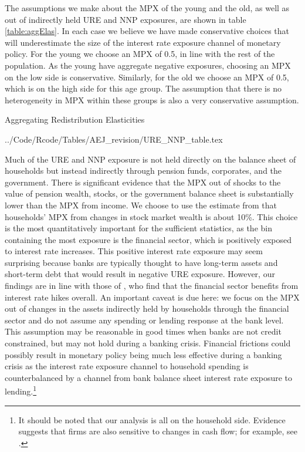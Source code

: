 \documentclass[titlepage]{\econtex}\newcommand{\texname}{ConsumptionHeterogeneity}
\newcommand{\tabdir}{../Code/Rcode/Tables/AEJ_revision}
\begin{document}
	The assumptions we make about the MPX of the young and the old, as well as out of indirectly held URE and NNP exposures, are shown in table \ref{table:aggElas}. In each case we believe we have made conservative choices that will underestimate the size of the interest rate exposure channel of monetary policy. For the young we choose an MPX of 0.5, in line with the rest of the population. As the young have aggregate negative exposures, choosing an MPX on the low side is conservative. Similarly, for the old we choose an MPX of 0.5, which is on the high side for this age group. The assumption that there is no heterogeneity in MPX within these groups is also a very conservative assumption.
	\begin{center}
		\begin{table}
			\caption{Aggregating Redistribution Elasticities}
			\label{table:aggElas}
			 \tabdir/URE_NNP_table.tex
		\end{table}
	\end{center}
	Much of the URE and NNP exposure is not held directly on the balance sheet of households but instead indirectly through pension funds, corporates, and the government. There is significant evidence that the MPX out of shocks to the value of pension wealth, stocks, or the government balance sheet is substantially lower than the MPX from income. We choose to use the estimate from  that households' MPX from changes in stock market wealth is about 10\%. This choice is the most quantitatively important for the sufficient statistics, as the bin containing the most exposure is the financial sector, which is positively exposed to interest rate increases. This positive interest rate exposure may seem surprising because banks are typically thought to have long-term assets and short-term debt that would result in negative URE exposure. However, our findings are in line with those of , who find that the financial sector benefits from interest rate hikes overall. An important caveat is due here: we focus on the MPX out of changes in the assets indirectly held by households through the financial sector and do not assume any spending or lending response at the bank level. This assumption may be reasonable in good times when banks are not credit constrained, but may not hold during a banking crisis. Financial frictions could possibly result in monetary policy being much less effective during a banking crisis as the interest rate exposure channel to household spending is counterbalanced by a channel from bank balance sheet interest rate exposure to lending.\footnote{It should be noted that our analysis is all on the household side. Evidence suggests that firms are also sensitive to changes in cash flow; for example, see .} 
	
\end{document}

